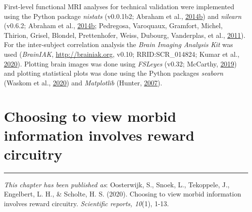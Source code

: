 \documentclass[11pt,american,a4paper,oneside,]{memoir} %
\begin{document}
First-level functional MRI analyses for technical validation were implemented using the Python package \emph{nistats} (v0.0.1b2; Abraham et al., \protect\hyperlink{ref-Abraham2014-ef}{2014}\protect\hyperlink{ref-Abraham2014-ef}{b}) and \emph{nilearn} (v0.6.2; Abraham et al., \protect\hyperlink{ref-Abraham2014-ef}{2014}\protect\hyperlink{ref-Abraham2014-ef}{b}; Pedregosa, Varoquaux, Gramfort, Michel, Thirion, Grisel, Blondel, Prettenhofer, Weiss, Dubourg, Vanderplas, et al., \protect\hyperlink{ref-Pedregosa2011-bp}{2011}). For the inter-subject correlation analysis the \emph{Brain Imaging Analysis Kit} was used (\emph{BrainIAK}, \url{http://brainiak.org}, v0.10; RRID:SCR\_014824; Kumar et al., \protect\hyperlink{ref-Kumar2020-eo}{2020}). Plotting brain images was done using \emph{FSLeyes} (v0.32; McCarthy, \protect\hyperlink{ref-McCarthy2019-yt}{2019}) and plotting statistical plots was done using the Python packages \emph{seaborn} (Waskom et al., \protect\hyperlink{ref-Waskom2020-qq}{2020}) and \emph{Matplotlib} (Hunter, \protect\hyperlink{ref-Hunter2007-at}{2007}).

\hypertarget{morbid-curiosity}{%
\chapter{Choosing to view morbid information involves reward circuitry}\label{morbid-curiosity}}


\vspace*{\fill}

\begin{center}\rule{0.5\linewidth}{0.5pt}\end{center}

\small

\noindent
\emph{This chapter has been published as}: Oosterwijk, S., Snoek, L., Tekoppele, J., Engelbert, L. H., \& Scholte, H. S. (2020). Choosing to view morbid information involves reward circuitry. \emph{Scientific reports, 10}(1), 1-13.

\newpage
\normalsize
\end{document}
